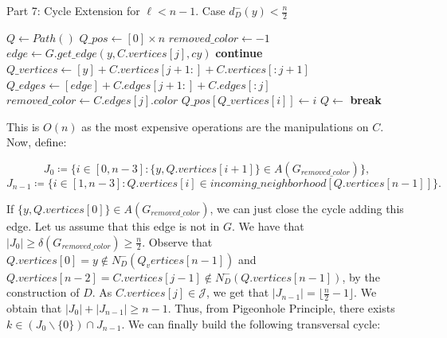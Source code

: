 \begin{algorithm}[H]
    \caption{Part 7: Cycle Extension for \( \ell < n - 1 \). Case \( d^-_D(y) < \frac{n}{2} \)}
    \begin{algorithmic}[1]
            \State $Q \gets Path()$
            \State $Q\_pos \gets [0] \times n$
            \State $removed\_color \gets -1$
                \State $edge \gets G.get\_edge(y, C.vertices[j], cy)$
                    \State \textbf{continue}
                \EndIf
                \State $Q\_vertices \gets [y] + C.vertices[j + 1:] + C.vertices[:j + 1]$
                \State $Q\_edges \gets [edge] + C.edges[j + 1:] + C.edges[:j]$
                \State $removed\_color \gets C.edges[j].color$
                    \State $Q\_pos[Q\_vertices[i]] \gets i$
                \EndFor
                \State $Q \gets$ 
                \State \textbf{break}
            \EndFor
        \EndFunction
    \end{algorithmic}
\end{algorithm}

This is $O(n)$ as the most expensive operations are the manipulations on $C$.
Now, define:

\begin{equation}
    J_0 \coloneqq \{i \in [0, n - 3]: \{y, Q.vertices[i+1]\} \in A(G_{removed\_color})\},
\end{equation}
\begin{equation}
    J_{n-1} \coloneqq \{i \in [1, n - 3] : Q.vertices[i] \in incoming\_neighborhood[Q.vertices[n-1]]\}.
\end{equation}

If $\{y, Q.vertices[0]\} \in A(G_{removed\_color})$, we can just close the cycle adding this edge.
Let us assume that this edge is not in $G$. We have that $|J_0| \geq \delta(G_{removed\_color}) \geq \frac{n}{2}$.
Observe that $Q.vertices[0] = y \notin N^-_D(Q_vertices[n - 1])$ and $Q.vertices[n - 2] = C.vertices[j - 1] \notin N^-_D(Q.vertices[n - 1])$,
by the construction of $D$. As $C.vertices[j] \in \mathcal{J}$, we get that
$|J_{n-1}| = \lfloor \frac{n}{2} - 1 \rfloor$. We obtain that $|J_0| + |J_{n-1}| \geq n - 1$.
Thus, from Pigeonhole Principle, there exists $k \in (J_0 \backslash \{0\}) \cap J_{n-1}$. 
We can finally build the following transversal cycle:

